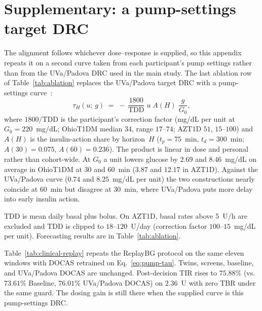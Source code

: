 \documentclass[a4paper,fleqn]{cas-sc}
\begin{document}
\section{Supplementary: a pump-settings target DRC}\label{app:clinical-tau}

The alignment follows whichever dose--response is supplied, so this appendix repeats it on a second curve taken from each participant's pump settings rather than from the UVa/Padova DRC used in the main study.
The last ablation row of Table~\ref{tab:ablation} replaces the UVa/Padova target
DRC with a pump-settings curve~\citep{walsh2011}:
\begin{equation}
  \tau_H(u;\,g) \;=\; -\,\frac{1800}{\mathrm{TDD}}\; u \; A(H)\;\frac{g}{G_0},
  \label{eq:pump-tau}
\end{equation}
where $1800/\mathrm{TDD}$ is the participant's correction factor (mg/dL per unit
at $G_0{=}220$~mg/dL; OhioT1DM median $34$, range $17$--$74$; AZT1D $51$,
$15$--$100$) and $A(H)$ is the insulin-action share by horizon~$H$
($t_p{=}75$~min, $t_d{=}300$~min; $A(30){=}0.075$, $A(60){=}0.236$). The product
is linear in dose and personal rather than cohort-wide. At $G_0$ a unit lowers
glucose by $2.69$ and $8.46$~mg/dL on average in OhioT1DM at 30 and 60~min
($3.87$ and $12.17$ in AZT1D). Against the UVa/Padova curve ($0.74$ and
$8.25$~mg/dL per unit) the two constructions nearly coincide at 60~min but
disagree at 30~min, where UVa/Padova puts more delay into early insulin action.

$\mathrm{TDD}$ is mean daily basal plus bolus. On AZT1D, basal rates above
5~U/h are excluded and $\mathrm{TDD}$ is clipped to $18$--$120$~U/day (correction
factor $100$--$15$~mg/dL per unit). Forecasting results are in
Table~\ref{tab:ablation}.

Table~\ref{tab:clinical-replay} repeats the ReplayBG protocol on the same eleven
windows with DOCAS retrained on Eq.~\ref{eq:pump-tau}. Twins, screens, baseline,
and UVa/Padova DOCAS are unchanged. Post-decision TIR rises to $75.88\%$
(vs.\ $73.61\%$ Baseline, $76.01\%$ UVa/Padova DOCAS) on $2.36$~U with zero TBR under the
same guard. The dosing gain is still there when the supplied curve is this pump-settings DRC.

\FloatBarrier

\FloatBarrier



\end{document}
